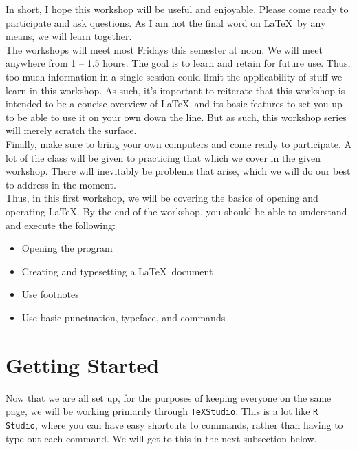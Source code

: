 \documentclass[11pt]{article}
\newcommand{\forceindent}{\leavevmode{\parindent=1.5em\indent}} %
\begin{document}
	In short, I hope this workshop will be useful and enjoyable. Please come ready to participate and ask questions. As I am not the final word on \LaTeX\ by any means, we will learn together. \\

	The workshops will meet most Fridays this semester at noon. We will meet anywhere from 1 -- 1.5 hours. The goal is to learn and retain for future use. Thus, too much information in a single session could limit the applicability of stuff we learn in this workshop. As such, it's important to reiterate that this workshop is intended to be a concise overview of \LaTeX\ and its basic features to set you up to be able to use it on your own down the line. But as such, this workshop series will merely scratch the surface. \\
	
	Finally, make sure to bring your own computers and come ready to participate. A lot of the class will be given to practicing that which we cover in the given workshop. There will inevitably be problems that arise, which we will do our best to address in the moment. \\

	Thus, in this first workshop, we will be covering the basics of opening and operating \LaTeX. By the end of the workshop, you should be able to understand and execute the following:

\begin{itemize}
	\item Opening the program
	\item Creating and typesetting a \LaTeX\ document
	\item Use footnotes
	\item Use basic punctuation, typeface, and commands
\end{itemize}

\newpage

\section{Getting Started}

	\forceindent Now that we are all set up, for the purposes of keeping everyone on the same page, we will be working primarily through \texttt{TeXStudio}. This is a lot like \texttt{R Studio}, where you can have easy shortcuts to commands, rather than having to type out each command. We will get to this in the next subsection below. \\
\end{document}
